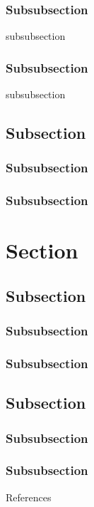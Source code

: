 \documentclass[
14pt,notheorems,hyperref={pdfauthor=whatever}
]{beamer}
\begin{document}
\subsubsection{Subsubsection}
\begin{frame}{}
  \begin{block}{}
    subsubsection
  \end{block}
\end{frame}

\subsubsection{Subsubsection}
\begin{frame}{}
  \begin{block}{}
    subsubsection
  \end{block}
\end{frame}
\subsection{Subsection}
\subsubsection{Subsubsection}
\subsubsection{Subsubsection}
\section{Section}
\subsection{Subsection}
\subsubsection{Subsubsection}
\subsubsection{Subsubsection}
\subsection{Subsection}
\subsubsection{Subsubsection}
\subsubsection{Subsubsection}

\begin{frame}[allowframebreaks]{References}
    \printbibliography
\end{frame}
\end{document}
